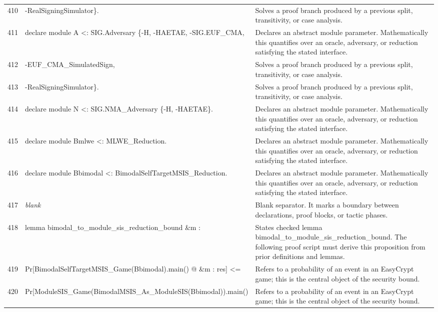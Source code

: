 \documentclass[10pt]{article}
\begin{document}
\begin{longtable}{r L{0.53\textwidth} L{0.37\textwidth}}
410 & {\ttfamily\scriptsize                                  -RealSigningSimulator\}.} & Solves a proof branch produced by a previous split, transitivity, or case analysis. \\
411 & {\ttfamily\scriptsize declare module A <: SIG.Adversary \{-H, -HAETAE, -SIG.EUF\_CMA,} & Declares an abstract module parameter.  Mathematically this quantifies over an oracle, adversary, or reduction satisfying the stated interface. \\
412 & {\ttfamily\scriptsize                                     -EUF\_CMA\_SimulatedSign,} & Solves a proof branch produced by a previous split, transitivity, or case analysis. \\
413 & {\ttfamily\scriptsize                                     -RealSigningSimulator\}.} & Solves a proof branch produced by a previous split, transitivity, or case analysis. \\
414 & {\ttfamily\scriptsize declare module N <: SIG.NMA\_Adversary \{-H, -HAETAE\}.} & Declares an abstract module parameter.  Mathematically this quantifies over an oracle, adversary, or reduction satisfying the stated interface. \\
415 & {\ttfamily\scriptsize declare module Bmlwe <: MLWE\_Reduction.} & Declares an abstract module parameter.  Mathematically this quantifies over an oracle, adversary, or reduction satisfying the stated interface. \\
416 & {\ttfamily\scriptsize declare module Bbimodal <: BimodalSelfTargetMSIS\_Reduction.} & Declares an abstract module parameter.  Mathematically this quantifies over an oracle, adversary, or reduction satisfying the stated interface. \\
417 & {\ttfamily\scriptsize \emph{blank}} & Blank separator.  It marks a boundary between declarations, proof blocks, or tactic phases. \\
418 & {\ttfamily\scriptsize lemma bimodal\_to\_module\_sis\_reduction\_bound \&m :} & States checked lemma bimodal\_to\_module\_sis\_reduction\_bound.  The following proof script must derive this proposition from prior definitions and lemmas. \\
419 & {\ttfamily\scriptsize   Pr[BimodalSelfTargetMSIS\_Game(Bbimodal).main() @ \&m : res] <=} & Refers to a probability of an event in an EasyCrypt game; this is the central object of the security bound. \\
420 & {\ttfamily\scriptsize   Pr[ModuleSIS\_Game(BimodalMSIS\_As\_ModuleSIS(Bbimodal)).main()} & Refers to a probability of an event in an EasyCrypt game; this is the central object of the security bound. \\

\end{longtable}
\end{document}
